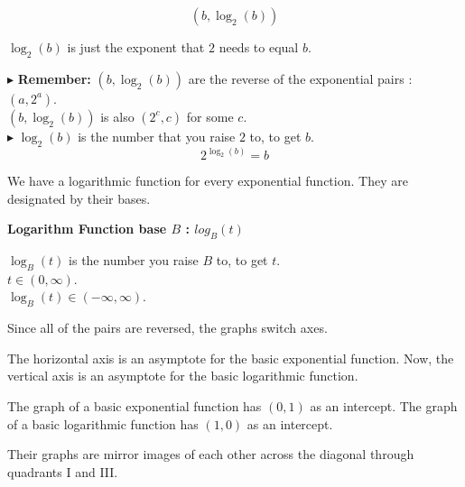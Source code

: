 \documentclass{ximera}
\begin{document}
\[
(b, \log_2(b))
\]




$\log_2(b)$ is just the exponent that $2$ needs to equal $b$.





$\blacktriangleright$ \textbf{Remember:} $(b, \log_2(b))$ are the reverse of the exponential pairs : $(a, 2^a)$.  \\

$(b, \log_2(b))$ is also $(2^c, c)$ for some $c$. \\


$\blacktriangleright$  $\log_2(b)$ is the number that you raise $2$ to, to get $b$.  \\

\[   2^{\log_2(b)} = b     \]

We have a logarithmic function for every exponential function.  They are designated by their bases.
















\begin{definition} \textbf{\textcolor{green!50!black}{Logarithm Function base $B$ : $log_B(t)$}}


$\log_B(t)$ is the number you raise $B$ to, to get $t$. \\

$t \in (0, \infty)$. \\

$\log_B(t) \in (-\infty, \infty)$.


\end{definition}






Since all of the pairs are reversed, the graphs switch axes.



The horizontal axis is an asymptote for the basic exponential function. Now, the vertical axis is an asymptote for the basic logarithmic function.


The graph of a basic exponential function has $(0,1)$ as an intercept.  The graph of a basic logarithmic function has $(1,0)$ as an intercept. 


Their graphs are mirror images of each other across the diagonal through quadrants I and III.
\end{document}
